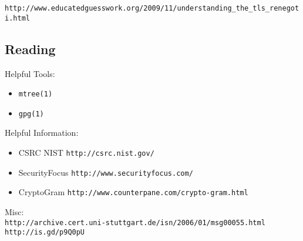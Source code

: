 \documentclass[xga]{xdvislides}
\begin{document}
\verb+http://www.educatedguesswork.org/2009/11/understanding_the_tls_renegoti.html+
\Normalsize

\subsection{Reading}
Helpful Tools:
\begin{itemize}
	\item \verb+mtree(1)+
	\item \verb+gpg(1)+
\end{itemize}
\addvspace{.5in}
Helpful Information:
\begin{itemize}
	\item CSRC NIST \verb+http://csrc.nist.gov/+
	\item SecurityFocus \verb+http://www.securityfocus.com/+
	\item CryptoGram \verb+http://www.counterpane.com/crypto-gram.html+
\end{itemize}
\addvspace{.5in}
Misc:
\\

\verb+http://archive.cert.uni-stuttgart.de/isn/2006/01/msg00055.html+
\\

\verb+http://is.gd/p9Q0pU+
\end{document}
